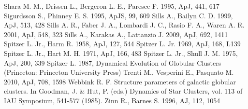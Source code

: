 \begin{thebibliography}{99}
 Shara
  M. M., Drissen L., Bergeron L. E.,  Paresce F. 1995, ApJ, 441, 617
 Sigurdsson S., Phinney
  E. S. 1995, ApJS, 99, 609
  Sills A., Bailyn C. D. 1999, ApJ, 513, 428
 Sills
  A. R., Faber J. A., Lombardi J. C., Rasio F. A., Waren A. R. 2001,
  ApJ, 548, 323
 Sills
  A., Karakas A., Lattanzio J. 2009, ApJ, 692, 1411
 Spitzer
  L. Jr., Harm R. 1958, ApJ, 127, 544
 Spitzer
  L. Jr. 1969, ApJ, 168, L139
  Spitzer L. Jr., Hart M. H. 1971, ApJ, 166, 483
  Spitzer L. Jr., Shull J. M. 1975, ApJ, 200, 339
 Spitzer
  L. 1987, Dynamical Evolution of Globular Clusters (Princeton:
  Princeton University Press)
 Trenti M., Vesperini E., Pasquato
  M. 2010, ApJ, 708, 1598 
  Webbink
  R. F. Structure parameters of galactic globular clusters. In
  Goodman, J. \& Hut, P. (eds.) Dynamics of Star Clusters, vol. 113 of
  IAU Symposium, 541-577 (1985).
 Zinn
  R., Barnes S. 1996, AJ, 112, 1054

\end{thebibliography}


